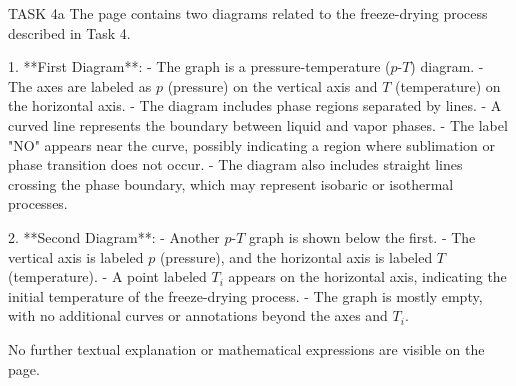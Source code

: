 TASK 4a  
The page contains two diagrams related to the freeze-drying process described in Task 4.

1. **First Diagram**:  
   - The graph is a pressure-temperature (\( p \)-\( T \)) diagram.  
   - The axes are labeled as \( p \) (pressure) on the vertical axis and \( T \) (temperature) on the horizontal axis.  
   - The diagram includes phase regions separated by lines.  
   - A curved line represents the boundary between liquid and vapor phases.  
   - The label "NO" appears near the curve, possibly indicating a region where sublimation or phase transition does not occur.  
   - The diagram also includes straight lines crossing the phase boundary, which may represent isobaric or isothermal processes.

2. **Second Diagram**:  
   - Another \( p \)-\( T \) graph is shown below the first.  
   - The vertical axis is labeled \( p \) (pressure), and the horizontal axis is labeled \( T \) (temperature).  
   - A point labeled \( T_i \) appears on the horizontal axis, indicating the initial temperature of the freeze-drying process.  
   - The graph is mostly empty, with no additional curves or annotations beyond the axes and \( T_i \).

No further textual explanation or mathematical expressions are visible on the page.